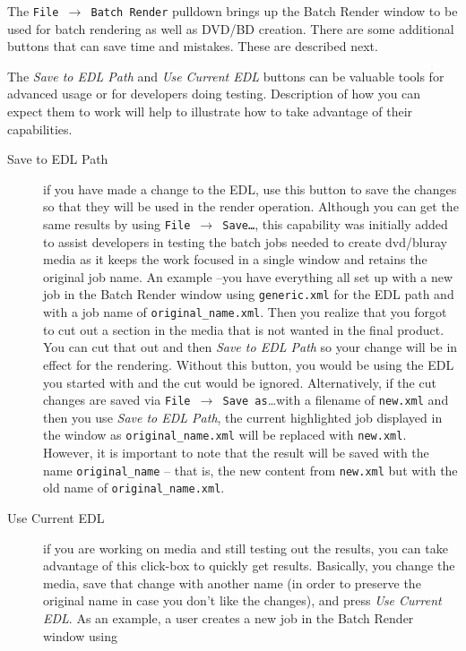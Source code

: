 The \texttt{File $\rightarrow$ Batch Render} pulldown brings up the
Batch Render window to be used for batch rendering as well as DVD/BD
creation.  There are some additional buttons that can save time and
mistakes.  These are described next.

The \textit{Save to EDL Path} and \textit{Use Current EDL} buttons
can be valuable tools for advanced usage or for developers doing
testing.  Description of how you can expect them to work will help
to illustrate how to take advantage of their capabilities.

\begin{description}
\item[Save to EDL Path] if you have made a change to the EDL, use
  this button to save the changes so that they will be used in the
  render operation.  Although you can get the same results by using
  \texttt{File $\rightarrow$ Save\dots}, this capability was initially
  added to assist developers in testing the batch jobs needed to
  create dvd/bluray media as it keeps the work focused in a single
  window and retains the original job name.  An example --you have
  everything all set up with a new job in the Batch Render window
  using \texttt{generic.xml} for the EDL path and with a job name of
  \texttt{original\_name.xml}.  Then you realize that you forgot to
  cut out a section in the media that is not wanted in the final
  product.  You can cut that out and then \textit{Save to EDL Path} so
  your change will be in effect for the rendering.  Without this
  button, you would be using the EDL you started with and the cut
  would be ignored.  Alternatively, if the cut changes are saved via
  \texttt{File $\rightarrow$ Save as}\dots with a filename of
  \texttt{new.xml} and then you use \textit{Save to EDL Path}, the
  current highlighted job displayed in the window as
  \texttt{original\_name.xml} will be replaced with \texttt{new.xml}.
  However, it is important to note that the result will be saved with
  the name \texttt{original\_name} – that is, the new content from
  \texttt{new.xml} but with the old name of
  \texttt{original\_name.xml}.
\item[Use Current EDL] if you are working on media and still testing
  out the results, you can take advantage of this click-box to quickly
  get results.  Basically, you change the media, save that change with
  another name (in order to preserve the original name in case you
  don't like the changes), and press \textit{Use Current EDL}.  As an
  example, a user creates a new job in the Batch Render window using

\end{description}
